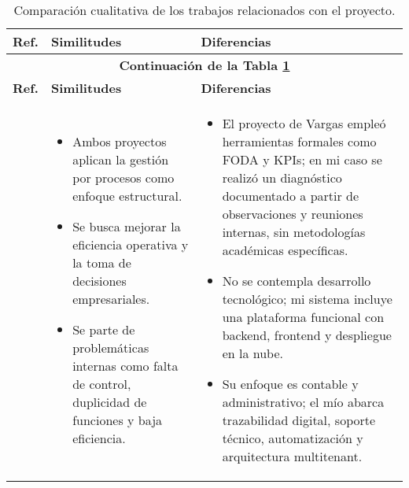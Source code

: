 \begin{longtable}{m{.05\paperwidth} *{2}{m{.33\paperwidth}} @{}}
	\caption{Comparación cualitativa de los trabajos relacionados con el proyecto.}
	\label{table:trabajosRelacionados}\\
	\hline
	\textbf{Ref.} & \textbf{Similitudes} & \textbf{Diferencias} \\
	\hline
	\endfirsthead
	
	\multicolumn{3}{c}{\textbf{Continuación de la Tabla \ref{table:trabajosRelacionados}}} \\
	\hline
	\textbf{Ref.} & \textbf{Similitudes} & \textbf{Diferencias} \\
	\hline
	\endhead
	\hline
	\endlastfoot

	\cite{Vargas2018} &
	\begin{itemize}
	  \item Ambos proyectos aplican la gestión por procesos como enfoque estructural.
	  \item Se busca mejorar la eficiencia operativa y la toma de decisiones empresariales.
	  \item Se parte de problemáticas internas como falta de control, duplicidad de funciones y baja eficiencia.
	\end{itemize} &
	\begin{itemize}
	  \item El proyecto de Vargas empleó herramientas formales como FODA y KPIs; en mi caso se realizó un diagnóstico documentado a partir de observaciones y reuniones internas, sin metodologías académicas específicas.
	  \item No se contempla desarrollo tecnológico; mi sistema incluye una plataforma funcional con backend, frontend y despliegue en la nube.
	  \item Su enfoque es contable y administrativo; el mío abarca trazabilidad digital, soporte técnico, automatización y arquitectura multitenant.
	\end{itemize} \\	
\midrule


\end{longtable}
